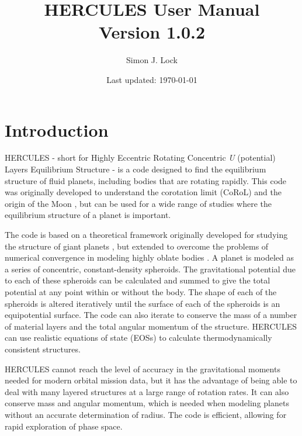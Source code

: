 \documentclass[11pt, oneside]{article}   	%
\title{HERCULES User Manual \\ \large Version 1.0.2}
\author{Simon J. Lock}
\date{Last updated:  \today }							%
\begin{document}
\maketitle

\makeatletter
{}
\makeatother

\clearpage
\clearpage

\section{Introduction}

HERCULES - short for Highly Eccentric Rotating Concentric {\it U} (potential) Layers Equilibrium Structure - is a code designed to find the equilibrium structure of fluid planets, including bodies that are rotating rapidly. 
This code was originally developed to understand the corotation limit (CoRoL) \citep{Lock2017} and the origin of the Moon \citep{Lock2018moon}, but can be used for a wide range of studies where the equilibrium structure of a planet is important.

The code is based on a theoretical framework originally developed for studying the structure of giant planets \citep{Hubbard2012, Hubbard2013}, but extended to overcome the problems of numerical convergence in modeling highly oblate bodies \citep{Hubbard2014, Kong2013}.
A planet is modeled as a series of concentric, constant-density spheroids.
The gravitational potential due to each of these spheroids can be calculated and summed to give the total potential at any point within or without the body.
The shape of each of the spheroids is altered iteratively until the surface of each of the spheroids is an equipotential surface.
The code can also iterate to conserve the mass of a number of material layers and the total angular momentum of the structure. HERCULES can use realistic equations of state (EOSs) to calculate thermodynamically consistent structures.

HERCULES cannot reach the level of accuracy in the gravitational moments needed for modern orbital mission data, but it has the advantage of being able to deal with many layered structures at a large range of rotation rates.
It can also conserve mass and angular momentum, which is needed when modeling planets without an accurate determination of radius. 
The code is efficient, allowing for rapid exploration of phase space.
\end{document}
